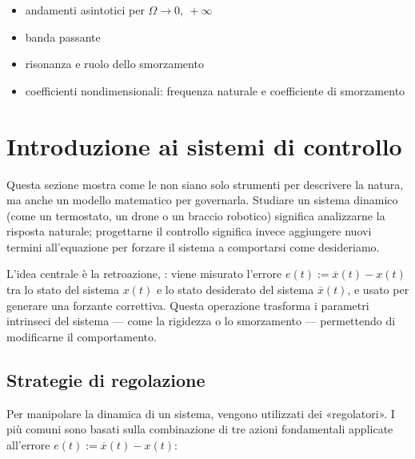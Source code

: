\documentclass[letterpaper,10pt,italian]{jupyterBook}
\begin{document}
\sphinxAtStartPar
{} 
\begin{itemize}
\item {} 
\sphinxAtStartPar
andamenti asintotici per \(\Omega \rightarrow 0, \ +\infty\)

\item {} 
\sphinxAtStartPar
banda passante

\item {} 
\sphinxAtStartPar
risonanza e ruolo dello smorzamento

\item {} 
\sphinxAtStartPar
coefficienti non\sphinxhyphen{}dimensionali: frequenza naturale e coefficiente di smorzamento

\end{itemize}

\sphinxstepscope


\section{Introduzione ai sistemi di controllo}
\label{\detokenize{ch/control-intro:introduzione-ai-sistemi-di-controllo}}\label{\detokenize{ch/control-intro:control-hs-intro}}\label{\detokenize{ch/control-intro::doc}}
\sphinxAtStartPar
Questa sezione mostra come le {\hyperref[\detokenize{ch/ode:ode-hs}]{}} non siano solo strumenti per descrivere la natura, ma anche un modello matematico per governarla. Studiare un sistema dinamico (come un termostato, un drone o un braccio robotico) significa analizzarne la risposta naturale; progettarne il controllo significa invece aggiungere nuovi termini all’equazione per forzare il sistema a comportarsi come desideriamo.

\sphinxAtStartPar
L’idea centrale è la retroazione, : viene misurato l’errore \(e(t) := \overline{x}(t) - x(t)\) tra lo stato del sistema \(x(t)\) e lo stato desiderato del sistema \(\overline{x}(t)\), e usato per generare una forzante correttiva. Questa operazione trasforma i parametri intrinseci del sistema — come la rigidezza o lo smorzamento — permettendo di modificarne il comportamento.


\subsection{Strategie di regolazione}
\label{\detokenize{ch/control-intro:strategie-di-regolazione}}\label{\detokenize{ch/control-intro:control-hs-intro-regulators}}
\sphinxAtStartPar
Per manipolare la dinamica di un sistema, vengono utilizzati dei «regolatori». I più comuni sono basati sulla combinazione di tre azioni fondamentali applicate all’errore \(e(t) := \overline{x}(t)−x(t)\):
\end{document}
